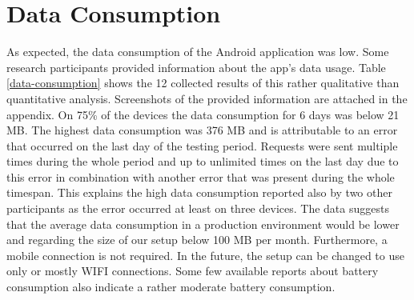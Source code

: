 \section{Data Consumption}
As expected, the data consumption of the Android application was low. Some research participants provided information about the app's data usage. Table \ref{data-consumption} shows the 12 collected results of this rather qualitative than quantitative analysis. Screenshots of the provided information are attached in the appendix. On 75\% of the devices the data consumption for 6 days was below 21 MB. The highest data consumption was 376 MB and is attributable to an error that occurred on the last day of the testing period. Requests were sent multiple times during the whole period and up to unlimited times on the last day due to this error in combination with another error that was present during the whole timespan. This explains the high data consumption reported also by two other participants as the error occurred at least on three devices. The data suggests that the average data consumption in a production environment would be lower and regarding the size of our setup below 100 MB per month. Furthermore, a mobile connection is not required. In the future, the setup can be changed to use only or mostly WIFI connections.
Some few available reports about battery consumption also indicate a rather moderate battery consumption.

